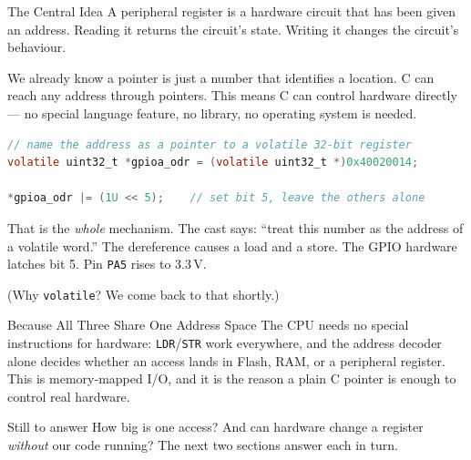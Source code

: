 \documentclass[9pt,aspectratio=169,xcolor=table]{beamer}
\begin{document}
\begin{frame}[fragile]{The Central Idea}
    \leavevmode
    {\small A peripheral register is a \alert{hardware circuit that has
    been given an address}. Reading it returns the circuit's state.
    Writing it changes the circuit's behaviour.}

    \vspace{2mm}
    {\small We already know a pointer is just a number that identifies a
    location. C can reach any address through pointers. This means
    \alert{C can control hardware directly} --- no special language
    feature, no library, no operating system is needed.}

    \vspace{2mm}
\begin{lstlisting}[language=C, basicstyle=\ttfamily\footnotesize]
// name the address as a pointer to a volatile 32-bit register
volatile uint32_t *gpioa_odr = (volatile uint32_t *)0x40020014;

*gpioa_odr |= (1U << 5);    // set bit 5, leave the others alone
\end{lstlisting}

    \vspace{1mm}
    {\small That is the \emph{whole} mechanism. The cast says: ``treat
    this number as the address of a volatile word.'' The dereference
    causes a load and a store. The GPIO hardware latches bit 5. Pin
    \texttt{PA5} rises to 3.3\,V.}

    \vspace{1mm}
    {\small (Why \texttt{volatile}? We come back to that shortly.)}
\end{frame}
\begin{frame}{Because All Three Share One Address Space}
    \leavevmode
    {\small The CPU needs no special instructions for hardware:
    \texttt{LDR}/\texttt{STR} work everywhere, and the address decoder
    alone decides whether an access lands in Flash, RAM, or a peripheral
    register. This is \alert{memory-mapped I/O}, and it is the reason a
    plain C pointer is enough to control real hardware.}

    \vspace{3mm}
    \begin{block}{Still to answer}
        How big is one access? And can hardware change a register
        \emph{without} our code running? The next two sections answer
        each in turn.
    \end{block}
\end{frame}
\end{document}
